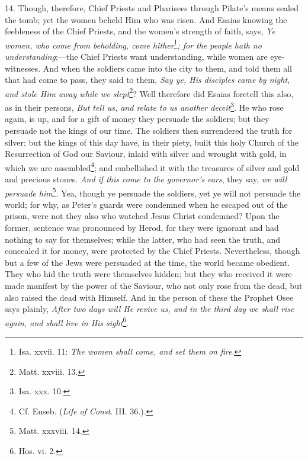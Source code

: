 14. Though, therefore, Chief Priests and Pharisees through Pilate’s means sealed the tomb; yet the women beheld Him who was risen. And Esaias knowing the feebleness of the Chief Priests, and the women’s strength of faith, says, \emph{Ye women, who come from beholding, come hither}\footnote{Isa. xxvii. 11: \emph{The women shall come, and set them on fire}.}\emph{; for the people hath no understanding};—the Chief Priests want understanding, while women are eye-witnesses. And when the soldiers came into the city to them, and told them all that had come to pass, they said to them, \emph{Say ye, His disciples came by night, and stole Him away while we slept}\footnote{Matt. xxviii. 13.}? Well therefore did Esaias foretell this also, as in their persons, \emph{But tell us, and relate to us another deceit}\footnote{Isa. xxx. 10.}. He who rose again, is up, and for a gift of money they persuade the soldiers; but they persuade not the kings of our time. The soldiers then surrendered the truth for silver; but the kings of this day have, in their piety, built this holy Church of the Resurrection of God our Saviour, inlaid with silver and wrought with gold, in which we are assembled\footnote{Cf. Euseb. (\emph{Life of Const}. III. 36.).}; and embellished it with the treasures of silver and gold and precious stones. \emph{And if this come to the governor’s ears}, they say, \emph{we will persuade him}\footnote{Matt. xxxviii. 14.}. Yea, though ye persuade the soldiers, yet ye will not persuade the world; for why, as Peter’s guards were condemned when he escaped out of the prison, were not they also who watched Jesus Christ condemned? Upon the former, sentence was pronounced by Herod, for they were ignorant and had nothing to say for themselves; while the latter, who had seen the truth, and concealed it for money, were protected by the Chief Priests. Nevertheless, though but a few of the Jews were persuaded at the time, the world became obedient. They who hid the truth were themselves hidden; but they who received it were made manifest by the power of the Saviour, who not only rose from the dead, but also raised the dead with Himself. And in the person of these the Prophet Osee says plainly, \emph{After two days will He revive us, and in the third day we shall rise again, and shall live in His sight}\footnote{Hos. vi. 2.}.

